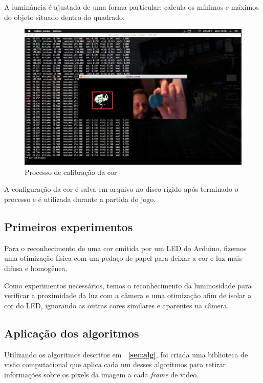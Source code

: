 \documentclass[12pt]{article}
\begin{document}
A lumin\^ancia \'e ajustada de uma forma particular: calcula os m\'inimos e m\'aximos do objeto situado dentro do quadrado.

	\begin{figure}[ht!]
		\begin{center}
			\includegraphics[scale=0.3]{img/calibracor.png}
			\footnotesize \caption{Processo de calibra\c c\~ao da cor }
		\end{center}
	\end{figure}	

A configura\c c\~ao da cor \'e salva em arquivo no disco r\'igido ap\'os terminado o processo e \'e utilizada durante a partida do jogo.

\subsection{Primeiros experimentos}
Para o reconhecimento de uma cor emitida por um LED do Arduino, fizemos uma otimiza\c c\~ao f\'isica
com um peda\c co de papel para deixar a cor e luz mais difusa e homog\^enea. 

Como experimentos necess\'arios, temos o reconhecimento da luminosidade para verificar
a proximidade da luz com a c\^amera e uma otimiza\c c\~ao afim de isolar a cor do LED,
ignorando as outras cores similares e aparentes na c\^amera.

\subsection{Aplica\c c\~ao dos algoritmos}
Utilizando os algoritmos descritos em \textbf{~\ref{sec:alg}}, foi criada uma biblioteca de vis\~ao computacional que aplica cada um desses
algoritmos para retirar informa\c c\~oes sobre os pixels da imagem a cada \emph{frame} de video.
\end{document}
